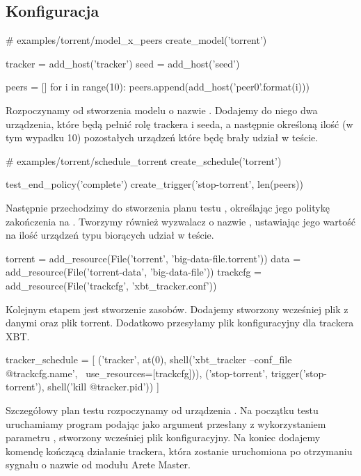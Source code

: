 \documentclass[00-praca-magisterska.tex]{subfiles}
\begin{document}
\subsection{Konfiguracja}

\begin{pythoncode}
  # examples/torrent/model_x_peers
  create_model('torrent')

  tracker = add_host('tracker')
  seed = add_host('seed')

  peers = []
  for i in range(10):
      peers.append(add_host('peer{0}'.format(i)))
\end{pythoncode}

Rozpoczynamy od stworzenia modelu o nazwie . Dodajemy do niego dwa
urządzenia, które będą pełnić rolę trackera i seeda, a następnie określoną ilość
(w tym wypadku 10) pozostałych urządzeń które będę brały udział w teście.

\begin{pythoncode}
  # examples/torrent/schedule_torrent
  create_schedule('torrent')
    
  test_end_policy('complete')
  create_trigger('stop-torrent', len(peers))
\end{pythoncode}

Następnie przechodzimy do stworzenia planu testu , określając jego
politykę zakończenia na . Tworzymy również wyzwalacz o nazwie
, ustawiając jego wartość na ilość urządzeń typu 
biorących udział w teście.

\begin{pythoncode}
  torrent = add_resource(File('torrent', 'big-data-file.torrent'))
  data = add_resource(File('torrent-data', 'big-data-file'))
  trackcfg = add_resource(File('trackcfg', 'xbt_tracker.conf'))
\end{pythoncode}

Kolejnym etapem jest stworzenie zasobów. Dodajemy stworzony wcześniej plik z
danymi oraz plik torrent. Dodatkowo przesyłamy plik konfiguracyjny dla trackera
XBT.

\begin{pythoncode}
  tracker_schedule = [
      ('tracker', at(0), shell('xbt_tracker --conf_file @{trackcfg.name}', \
          use_resources=[trackcfg])),
      ('stop-torrent', trigger('stop-torrent'), shell('kill @{tracker.pid}'))
  ]
\end{pythoncode}

Szczegółowy plan testu rozpoczynamy od urządzenia . Na początku testu
uruchamiamy program \code{xbt\_tracker} podając jako argument przesłany z
wykorzystaniem parametru \code{use\_resources}, stworzony wcześniej plik
konfiguracyjny. Na koniec dodajemy komendę kończącą działanie trackera, która
zostanie uruchomiona po otrzymaniu sygnału o nazwie \code{stop-torrent} od
modułu Arete Master.
\end{document}
